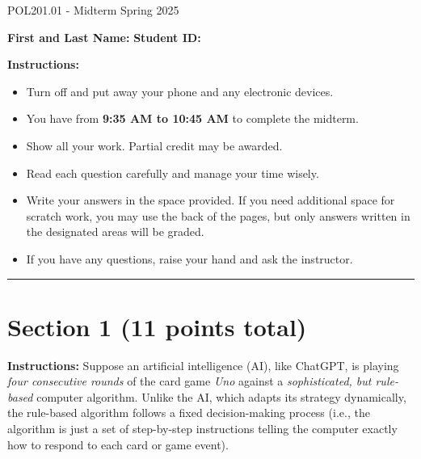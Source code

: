 \documentclass{article}
\begin{document}
 \hspace{1em} \vspace{-1.7em}
\begin{center}
   \Large   POL201.01 - Midterm Spring 2025
\end{center}

\vspace{1em}
\noindent\textbf{First and Last Name:} \underline{\hspace{8cm}}  \quad  \textbf{Student ID:} \underline{\hspace{4.4cm}}

\vspace{0.7em}
\noindent\textbf{Instructions:}

\vspace{-0.8em}
\begin{itemize}
    \setlength{\itemsep}{-0.35em}
    \item Turn off and put away your phone and any electronic devices.
    \item You have from \textbf{9:35 AM to 10:45 AM} to complete the midterm.
    \item Show all your work. Partial credit may be awarded.
    \item Read each question carefully and manage your time wisely.
    \item Write your answers in the space provided. If you need additional space for scratch work, you may use the back of the pages, but only answers written in the designated areas will be graded.
    \item If you have any questions, raise your hand and ask the instructor.
\end{itemize}
\vspace{-1.1em}
\noindent\rule{\linewidth}{0.4pt} %

\section*{Section 1 (11 points total)}

\noindent\textbf{Instructions:}
Suppose an artificial intelligence (AI), like ChatGPT, is playing \emph{four consecutive rounds} of the card game \emph{Uno} against a \emph{sophisticated, but rule-based} computer algorithm. Unlike the AI, which adapts its strategy dynamically, the rule-based algorithm follows a fixed decision-making process (i.e., the algorithm is just a set of step-by-step instructions telling the computer exactly how to respond to each card or game event).
\end{document}

